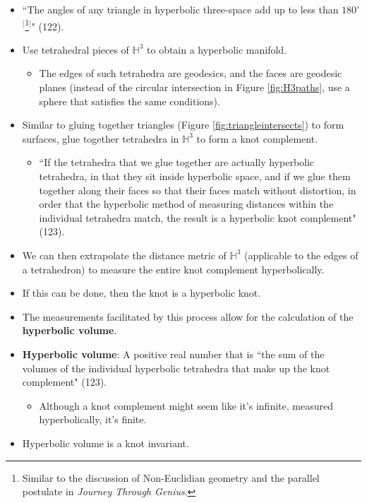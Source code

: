 \documentclass[titlepage]{article}
\numberwithin{figure}{section}
\numberwithin{table}{section}
\numberwithin{equation}{section}
\newcommand{\dq}[2]{``#1" (#2).}
\begin{document}
\begin{itemize}
    \item \dq{The angles of any triangle in hyperbolic three-space add up to less than $180^\circ$$^[$\footnote{Similar to the discussion of Non-Euclidian geometry and the parallel postulate in \emph{Journey Through Genius}.}$^]$}{122}
    \item Use tetrahedral pieces of $\mathbb{H}^3$ to obtain a hyperbolic manifold.
    \begin{itemize}
        \item The edges of such tetrahedra are geodesics, and the faces are geodesic planes (instead of the circular intersection in Figure \ref{fig:H3paths}, use a sphere that satisfies the same conditions).
    \end{itemize}
    \item Similar to gluing together triangles (Figure \ref{fig:triangleintersects}) to form surfaces, glue together tetrahedra in $\mathbb{H}^3$ to form a knot complement.
    \begin{itemize}
        \item \dq{If the tetrahedra that we glue together are actually hyperbolic tetrahedra, in that they sit inside hyperbolic space, and if we glue them together along their faces so that their faces match without distortion, in order that the hyperbolic method of measuring distances within the individual tetrahedra match, the result is a hyperbolic knot complement}{123}
    \end{itemize}
    \item We can then extrapolate the distance metric of $\mathbb{H}^3$ (applicable to the edges of a tetrahedron) to measure the entire knot complement hyperbolically.
    \item If this can be done, then the knot is a hyperbolic knot.
    \item The measurements facilitated by this process allow for the calculation of the \textbf{hyperbolic volume}.
    \item \textbf{Hyperbolic volume}: A positive real number that is \dq{the sum of the volumes of the individual hyperbolic tetrahedra that make up the knot complement}{123}
    \begin{itemize}
        \item Although a knot complement might seem like it's infinite, measured hyperbolically, it's finite.
    \end{itemize}
    \item Hyperbolic volume is a knot invariant.
    \begin{itemize}

\end{itemize}
\end{itemize}
\end{document}
